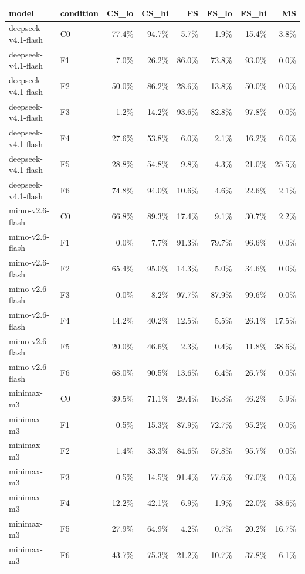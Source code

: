 \begin{tabular}{llrrrrrr}
\toprule
model & condition & CS\_lo & CS\_hi & FS & FS\_lo & FS\_hi & MS \\
\midrule
deepseek-v4.1-flash & C0 & 77.4\% & 94.7\% & 5.7\% & 1.9\% & 15.4\% & 3.8\% \\
deepseek-v4.1-flash & F1 & 7.0\% & 26.2\% & 86.0\% & 73.8\% & 93.0\% & 0.0\% \\
deepseek-v4.1-flash & F2 & 50.0\% & 86.2\% & 28.6\% & 13.8\% & 50.0\% & 0.0\% \\
deepseek-v4.1-flash & F3 & 1.2\% & 14.2\% & 93.6\% & 82.8\% & 97.8\% & 0.0\% \\
deepseek-v4.1-flash & F4 & 27.6\% & 53.8\% & 6.0\% & 2.1\% & 16.2\% & 6.0\% \\
deepseek-v4.1-flash & F5 & 28.8\% & 54.8\% & 9.8\% & 4.3\% & 21.0\% & 25.5\% \\
deepseek-v4.1-flash & F6 & 74.8\% & 94.0\% & 10.6\% & 4.6\% & 22.6\% & 2.1\% \\
mimo-v2.6-flash & C0 & 66.8\% & 89.3\% & 17.4\% & 9.1\% & 30.7\% & 2.2\% \\
mimo-v2.6-flash & F1 & 0.0\% & 7.7\% & 91.3\% & 79.7\% & 96.6\% & 0.0\% \\
mimo-v2.6-flash & F2 & 65.4\% & 95.0\% & 14.3\% & 5.0\% & 34.6\% & 0.0\% \\
mimo-v2.6-flash & F3 & 0.0\% & 8.2\% & 97.7\% & 87.9\% & 99.6\% & 0.0\% \\
mimo-v2.6-flash & F4 & 14.2\% & 40.2\% & 12.5\% & 5.5\% & 26.1\% & 17.5\% \\
mimo-v2.6-flash & F5 & 20.0\% & 46.6\% & 2.3\% & 0.4\% & 11.8\% & 38.6\% \\
mimo-v2.6-flash & F6 & 68.0\% & 90.5\% & 13.6\% & 6.4\% & 26.7\% & 0.0\% \\
minimax-m3 & C0 & 39.5\% & 71.1\% & 29.4\% & 16.8\% & 46.2\% & 5.9\% \\
minimax-m3 & F1 & 0.5\% & 15.3\% & 87.9\% & 72.7\% & 95.2\% & 0.0\% \\
minimax-m3 & F2 & 1.4\% & 33.3\% & 84.6\% & 57.8\% & 95.7\% & 0.0\% \\
minimax-m3 & F3 & 0.5\% & 14.5\% & 91.4\% & 77.6\% & 97.0\% & 0.0\% \\
minimax-m3 & F4 & 12.2\% & 42.1\% & 6.9\% & 1.9\% & 22.0\% & 58.6\% \\
minimax-m3 & F5 & 27.9\% & 64.9\% & 4.2\% & 0.7\% & 20.2\% & 16.7\% \\
minimax-m3 & F6 & 43.7\% & 75.3\% & 21.2\% & 10.7\% & 37.8\% & 6.1\% \\

\end{tabular}
